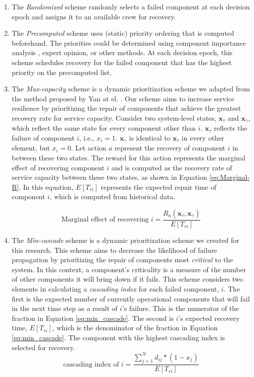 \documentclass[runningheads]{llncs}
\begin{document}
\begin{enumerate}
\item The \emph{Randomized} scheme randomly selects a failed component at each decision epoch and assigns it to an available crew for recovery. 
\item The \emph{Precomputed} scheme uses (static) priority ordering that is computed beforehand. The priorities could be determined using component importance analysis \cite{alobaidi_survivability_2016}, expert opinion, or other methods. At each decision epoch, this scheme schedules recovery for the failed component that has the highest priority on the precomputed list. 
\item The \emph{Max-capacity} scheme is a dynamic prioritization scheme we adapted from the method proposed by Yan at el. \cite{yan_dynamic_2021}. Our scheme aims to increase service resilience by prioritizing the repair of components that achieve the greatest recovery rate for service capacity. 
Consider two system-level states, $\mathbf{x}_\tau$ and $\mathbf{x}_\gamma$, which reflect the same state for every component other than $i$. $\mathbf{x}_\tau$ reflects the failure of component $i$, i.e., $x_i = 1$. $\mathbf{x}_\gamma$ is identical to $\mathbf{x}_\tau$ in every other element, but $x_i = 0$. Let action $a$ represent the recovery of component $i$ in between these two states. The reward for this action represents the marginal effect of recovering component $i$ and is computed as the recovery rate of service capacity between these two states, as shown in Equation \ref{eq:Marginal-R}. In this equation, $E[T_{ri}]$ represents the expected repair time of component $i$, which is computed from historical data. 

\begin{equation}
    \text{Marginal effect of recovering }i = \frac{R_a(\mathbf{x}_\tau, \mathbf{x}_\gamma)}{E[T_{ri}]}
    \label{eq:Marginal-R}
\end{equation}

\item The \emph{Min-cascade} scheme is a dynamic prioritization scheme we created for this research. This scheme aims to decrease the likelihood of failure propagation by prioritizing the repair of components most \emph{critical} to the system. In this context, a component's criticality is a measure of the number of other components it will bring down if it fails. This scheme considers two elements in calculating a \emph{cascading index} for each failed component, $i$. The first is the  expected number of currently operational components that will fail in the next time step as a result of $i$'s failure. This is the numerator of the fraction in Equation \ref{eq:min_cascade}. The second is $i$'s expected recovery time, $E[T_{ri}]$, which is the denominator of the fraction in Equation \ref{eq:min_cascade}. The component with the highest cascading index is selected for recovery. 
\begin{equation}
\label{eq:min_cascade}
\text{cascading index of } i 
= \frac{\sum_{j=1}^{N} d_{ij}*(1-x_j)}{E[T_{ri}]}
\end{equation}
\end{enumerate}
\end{document}
